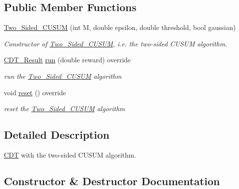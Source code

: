 \subsection*{Public Member Functions}
\begin{DoxyCompactItemize}
\item 
\mbox{\hyperlink{class_two___sided___c_u_s_u_m_aa7b99405317cde1df81c1d6906e7d4b8}{Two\+\_\+\+Sided\+\_\+\+C\+U\+S\+UM}} (int M, double epsilon, double threshold, bool gaussian)
\begin{DoxyCompactList}\small\item\em Constructor of \mbox{\hyperlink{class_two___sided___c_u_s_u_m}{Two\+\_\+\+Sided\+\_\+\+C\+U\+S\+UM}}, i.\+e. the two-\/sided C\+U\+S\+UM algorithm. \end{DoxyCompactList}\item 
\mbox{\hyperlink{class_c_d_t___result}{C\+D\+T\+\_\+\+Result}} \mbox{\hyperlink{class_two___sided___c_u_s_u_m_a6b6bb55a881148cb4e969b0fbf186315}{run}} (double reward) override
\begin{DoxyCompactList}\small\item\em run the \mbox{\hyperlink{class_two___sided___c_u_s_u_m}{Two\+\_\+\+Sided\+\_\+\+C\+U\+S\+UM}} algorithm \end{DoxyCompactList}\item 
void \mbox{\hyperlink{class_two___sided___c_u_s_u_m_a566b22cd9f410bc85aad359c4710a603}{reset}} () override
\begin{DoxyCompactList}\small\item\em reset the \mbox{\hyperlink{class_two___sided___c_u_s_u_m}{Two\+\_\+\+Sided\+\_\+\+C\+U\+S\+UM}} algorithm \end{DoxyCompactList}\end{DoxyCompactItemize}


\subsection{Detailed Description}
\mbox{\hyperlink{class_c_d_t}{C\+DT}} with the two-\/sided C\+U\+S\+UM algorithm. 

\subsection{Constructor \& Destructor Documentation}
\mbox{\label{class_two___sided___c_u_s_u_m_aa7b99405317cde1df81c1d6906e7d4b8}} 
